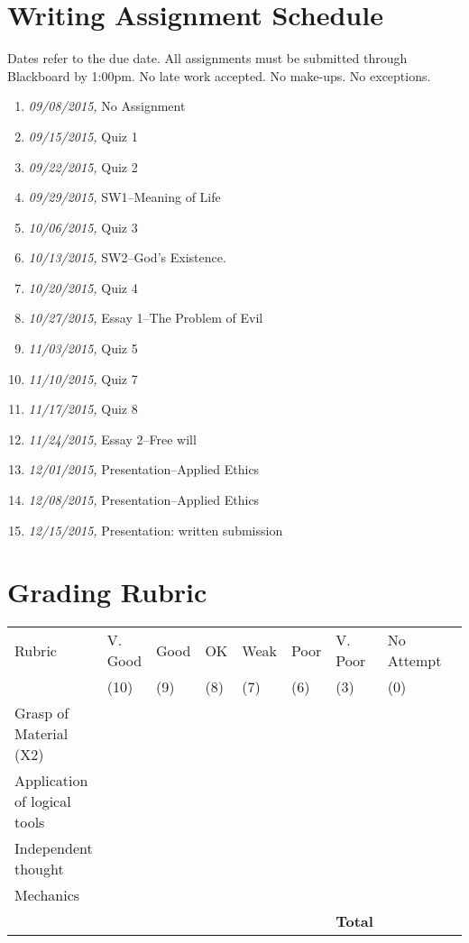 \documentclass[11pt,article,oneside]{memoir}
\begin{document}
\section{Writing Assignment Schedule}
Dates refer to the due date. All assignments must be submitted through Blackboard by 1:00pm. No late work accepted. No make-ups. No exceptions. 

\begin{enumerate}
\item \textit{09/08/2015,} No Assignment
\item \textit{09/15/2015,} Quiz 1 
\item \textit{09/22/2015,} Quiz 2
\item \textit{09/29/2015,} SW1--Meaning of Life 
\item \textit{10/06/2015,} Quiz 3
\item \textit{10/13/2015,} SW2--God's Existence.
\item \textit{10/20/2015,} Quiz 4
\item \textit{10/27/2015,} Essay 1--The Problem of Evil
\item \textit{11/03/2015,} Quiz 5
\item \textit{11/10/2015,} Quiz 7 
\item \textit{11/17/2015,} Quiz 8
\item \textit{11/24/2015,} Essay 2--Free will
\item \textit{12/01/2015,} Presentation--Applied Ethics
\item \textit{12/08/2015,} Presentation--Applied Ethics
\item \textit{12/15/2015,} Presentation: written submission
\end{enumerate}

\newpage
\section{Grading Rubric}

\begin{center}


\resizebox{14cm}{!} {
    \begin{tabular}{ | l | l | l | l | l | l | l | l | l |    }
    \hline
    Rubric &  V. Good & Good & OK & Weak & Poor & V. Poor & No Attempt \\  
	 & (10) & (9) & (8) & (7) & (6) & (3)  & (0) \\    \hline
    Grasp of Material (X2) & & & & & & &\\ \hline   
    Application of logical tools &  & & & & & &\\ \hline
	Independent thought &  & & & & & &\\ \hline
 Mechanics & & & & & &  &\\ \hline \hline
 & &  & & &  & \textbf{Total}  & \\ \hline
    \end{tabular}
}


\end{center}




\end{document}
